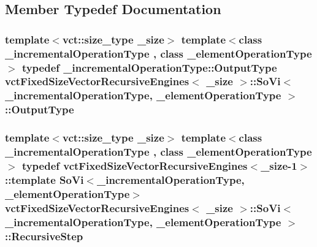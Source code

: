 \subsection{Member Typedef Documentation}
\hypertarget{classvct_fixed_size_vector_recursive_engines_1_1_so_vi_ae988d4e7479fa6cd314b1103f6a9aeab}{
\subsubsection[{Output\-Type}]{\setlength{\rightskip}{0pt plus 5cm}template$<$vct\-::size\-\_\-type \-\_\-size$>$ template$<$class \-\_\-incremental\-Operation\-Type , class \-\_\-element\-Operation\-Type $>$ typedef \-\_\-incremental\-Operation\-Type\-::\-Output\-Type {\bf vct\-Fixed\-Size\-Vector\-Recursive\-Engines}$<$ \-\_\-size $>$\-::{\bf So\-Vi}$<$ \-\_\-incremental\-Operation\-Type, \-\_\-element\-Operation\-Type $>$\-::{\bf Output\-Type}}}\label{classvct_fixed_size_vector_recursive_engines_1_1_so_vi_ae988d4e7479fa6cd314b1103f6a9aeab}
\hypertarget{classvct_fixed_size_vector_recursive_engines_1_1_so_vi_aad1f6b97a64a704bf2d21d95fb834c9b}{
\subsubsection[{Recursive\-Step}]{\setlength{\rightskip}{0pt plus 5cm}template$<$vct\-::size\-\_\-type \-\_\-size$>$ template$<$class \-\_\-incremental\-Operation\-Type , class \-\_\-element\-Operation\-Type $>$ typedef {\bf vct\-Fixed\-Size\-Vector\-Recursive\-Engines}$<$\-\_\-size-\/1$>$\-::template {\bf So\-Vi}$<$\-\_\-incremental\-Operation\-Type, \-\_\-element\-Operation\-Type$>$ {\bf vct\-Fixed\-Size\-Vector\-Recursive\-Engines}$<$ \-\_\-size $>$\-::{\bf So\-Vi}$<$ \-\_\-incremental\-Operation\-Type, \-\_\-element\-Operation\-Type $>$\-::{\bf Recursive\-Step}}}\label{classvct_fixed_size_vector_recursive_engines_1_1_so_vi_aad1f6b97a64a704bf2d21d95fb834c9b}


